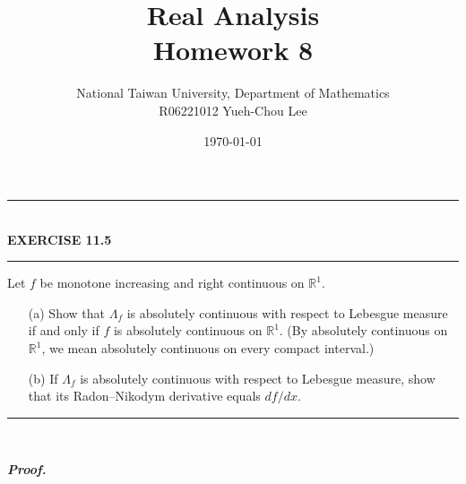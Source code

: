 \documentclass[a4paper,11pt]{article}
\title{Real Analysis\\ Homework 8}
\author{National Taiwan University, Department of Mathematics\\
R06221012 \hspace{0.2cm} Yueh-Chou Lee}
\date{\today}
\begin{document}
\maketitle

	\begin{flushleft}
		\rule[-0.5ex]{17cm}{2pt}\\
			\textbf{EXERCISE 11.5}\\
		\rule[1.5ex]{17cm}{0.5pt}
			Let $f$ be monotone increasing and right continuous on $\mathbb{R}^1$.
			\begin{enumerate}
				\item[(a)] Show that $\Lambda_f$ is absolutely continuous with respect to Lebesgue measure if and only if $f$ is absolutely continuous on $\mathbb{R}^1$. (By absolutely continuous on $\mathbb{R}^1$, we mean absolutely continuous on every compact interval.)

				\item[(b)] If $\Lambda_f$ is absolutely continuous with respect to Lebesgue measure, show that its Radon–Nikodym derivative equals $df/dx$.
			\end{enumerate}
		\rule[1.0ex]{17cm}{0.5pt}\
	\end{flushleft}
	\textbf{\textit{Proof.}}
\end{document}
